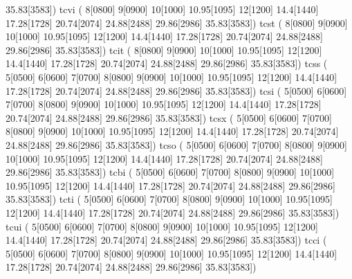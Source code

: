 {                          35.83[3583])
     \makefont tcvi   (%
                          8[0800] 9[0900] 
                          10[1000] 10.95[1095] 12[1200] 14.4[1440] 
                          17.28[1728] 20.74[2074] 24.88[2488] 29.86[2986]
                          35.83[3583])
     \makefont tcst   (%
                          8[0800] 9[0900] 
                          10[1000] 10.95[1095] 12[1200] 14.4[1440] 
                          17.28[1728] 20.74[2074] 24.88[2488] 29.86[2986]
                           35.83[3583])
     \makefont tcit   (%
                          8[0800] 9[0900] 
                          10[1000] 10.95[1095] 12[1200] 14.4[1440] 
                          17.28[1728] 20.74[2074] 24.88[2488] 29.86[2986]
                          35.83[3583])
     \makefont tcss   ( 5[0500] 6[0600] 7[0700] 8[0800] 9[0900] 
                          10[1000] 10.95[1095] 12[1200] 14.4[1440] 
                          17.28[1728] 20.74[2074] 24.88[2488] 29.86[2986]
                          35.83[3583])
     \makefont tcsi   ( 5[0500] 6[0600] 7[0700] 8[0800] 9[0900] 
                          10[1000] 10.95[1095] 12[1200] 14.4[1440] 
                          17.28[1728] 20.74[2074] 24.88[2488] 29.86[2986]
                          35.83[3583])
     \makefont tcsx   ( 5[0500] 6[0600] 7[0700] 8[0800] 9[0900] 
                          10[1000] 10.95[1095] 12[1200] 14.4[1440] 
                          17.28[1728] 20.74[2074] 24.88[2488] 29.86[2986]
                          35.83[3583])
     \makefont tcso   ( 5[0500] 6[0600] 7[0700] 8[0800] 9[0900] 
                          10[1000] 10.95[1095] 12[1200] 14.4[1440] 
                          17.28[1728] 20.74[2074] 24.88[2488] 29.86[2986]
                          35.83[3583])
     \makefont tcbi   ( 5[0500] 6[0600] 7[0700] 8[0800] 9[0900] 
                          10[1000] 10.95[1095] 12[1200] 14.4[1440] 
                          17.28[1728] 20.74[2074] 24.88[2488] 29.86[2986]
                          35.83[3583])
     \makefont tcti   ( 5[0500] 6[0600] 7[0700] 8[0800] 9[0900] 
                          10[1000] 10.95[1095] 12[1200] 14.4[1440] 
                          17.28[1728] 20.74[2074] 24.88[2488] 29.86[2986]
                          35.83[3583])
     \makefont tcui   ( 5[0500] 6[0600] 7[0700] 8[0800] 9[0900] 
                          10[1000] 10.95[1095] 12[1200] 14.4[1440] 
                          17.28[1728] 20.74[2074] 24.88[2488] 29.86[2986]
                          35.83[3583])
     \makefont tcci   ( 5[0500] 6[0600] 7[0700] 8[0800] 9[0900] 
                          10[1000] 10.95[1095] 12[1200] 14.4[1440] 
                          17.28[1728] 20.74[2074] 24.88[2488] 29.86[2986]
                          35.83[3583])
}
